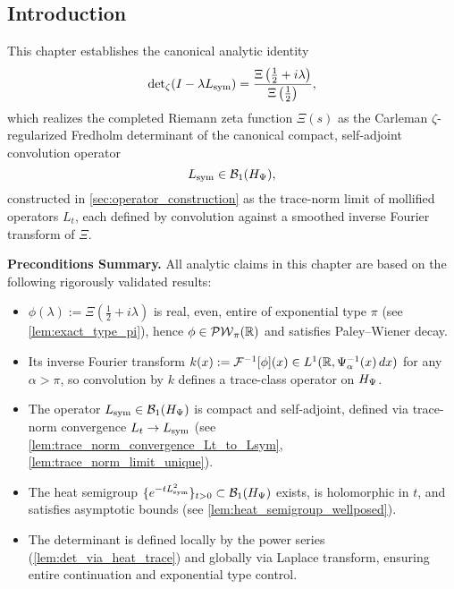 \subsection*{Introduction}
\label{sec:det_intro}

This chapter establishes the canonical analytic identity
\begin{equation}
\label{eq:zeta_det_identity}
\det\nolimits_\zeta(I - \lambda L_{\mathrm{sym}}) 
= \frac{\Xi\left( \tfrac{1}{2} + i\lambda \right)}{\Xi\left( \tfrac{1}{2} \right)},
\end{equation}
which realizes the completed Riemann zeta function \( \Xi(s) \) as the Carleman \(\zeta\)-regularized Fredholm determinant of the canonical compact, self-adjoint convolution operator
\[
L_{\mathrm{sym}} \in \mathcal{B}_1(H_{\Psi}),
\]
constructed in \cref{sec:operator_construction} as the trace-norm limit of mollified operators \( L_t \), each defined by convolution against a smoothed inverse Fourier transform of \( \Xi \).

\begin{previewbox}
\textbf{Preconditions Summary.}
All analytic claims in this chapter are based on the following rigorously validated results:

\begin{itemize}
  \item \( \phi(\lambda) := \Xi(\tfrac{1}{2} + i\lambda) \) is real, even, entire of exponential type \( \pi \) (see \cref{lem:exact_type_pi}), hence \( \phi \in \mathcal{PW}_{\pi}(\mathbb{R}) \) and satisfies Paley–Wiener decay.

  \item Its inverse Fourier transform \( k(x) := \mathcal{F}^{-1}[\phi](x) \in L^1(\mathbb{R}, \Psi_\alpha^{-1}(x)\, dx) \) for any \( \alpha > \pi \), so convolution by \( k \) defines a trace-class operator on \( H_{\Psi} \).

  \item The operator \( L_{\mathrm{sym}} \in \mathcal{B}_1(H_{\Psi}) \) is compact and self-adjoint, defined via trace-norm convergence \( L_t \to L_{\mathrm{sym}} \) (see \cref{lem:trace_norm_convergence_Lt_to_Lsym}, \cref{lem:trace_norm_limit_unique}).

  \item The heat semigroup \( \{ e^{-t L_{\mathrm{sym}}^2} \}_{t > 0} \subset \mathcal{B}_1(H_{\Psi}) \) exists, is holomorphic in \( t \), and satisfies asymptotic bounds (see \cref{lem:heat_semigroup_wellposed}).

  \item The determinant is defined locally by the power series (\cref{lem:det_via_heat_trace}) and globally via Laplace transform, ensuring entire continuation and exponential type control.
\end{itemize}
\end{previewbox}

